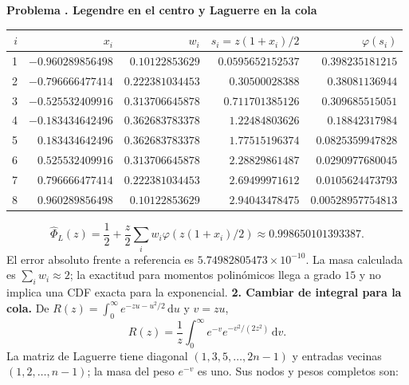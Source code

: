 \documentclass[11pt,a4paper]{article}
\newcommand{\dd}{\,\mathrm d}
\theoremstyle{definition}
\newcounter{problema}
\newenvironment{resuelto}[1]{\refstepcounter{problema}\par\medskip\Needspace{6\baselineskip}\textbf{Problema \theproblema. #1}\par}{\par\medskip}
\begin{document}
\begin{resuelto}{Legendre en el centro y Laguerre en la cola}
\begin{center}\small\begin{tabular}{rrrrr}
\toprule
$i$&$x_i$&$w_i$&$s_i=z(1+x_i)/2$&$\varphi(s_i)$\\
\midrule
1&$-0.960289856498$&$0.10122853629$&$0.0595652152537$&$0.398235181215$\\
2&$-0.796666477414$&$0.222381034453$&$0.30500028388$&$0.38081136944$\\
3&$-0.525532409916$&$0.313706645878$&$0.711701385126$&$0.309685515051$\\
4&$-0.183434642496$&$0.362683783378$&$1.22484803626$&$0.18842317984$\\
5&$0.183434642496$&$0.362683783378$&$1.77515196374$&$0.0825359947828$\\
6&$0.525532409916$&$0.313706645878$&$2.28829861487$&$0.0290977680045$\\
7&$0.796666477414$&$0.222381034453$&$2.69499971612$&$0.0105624473793$\\
8&$0.960289856498$&$0.10122853629$&$2.94043478475$&$0.00528957754813$\\
\bottomrule\end{tabular}\end{center}
\[
\widehat\Phi_L(z)=\frac12+\frac z2\sum_iw_i\varphi(z(1+x_i)/2)\approx0.998650101393387.
\]
El error absoluto frente a referencia es $5.74982805473\times10^{-10}$. La masa calculada es $\sum_iw_i\approx2$; la exactitud para momentos polinómicos llega a grado $15$ y no implica una CDF exacta para la exponencial.
\textbf{2. Cambiar de integral para la cola.} De $R(z)=\int_0^\infty e^{-zu-u^2/2}\dd u$ y $v=zu$,
\[
R(z)=\frac1z\int_0^\infty e^{-v}e^{-v^2/(2z^2)}\dd v.
\]
La matriz de Laguerre tiene diagonal $(1,3,5,\ldots,2n-1)$ y entradas vecinas $(1,2,\ldots,n-1)$; la masa del peso $e^{-v}$ es uno. Sus nodos y pesos completos son:


\end{resuelto}
\end{document}
